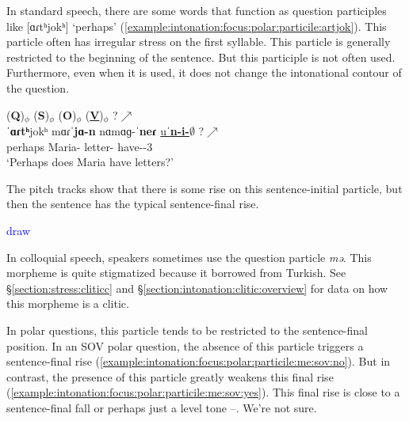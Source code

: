 In standard speech, there are some words that function as question participles like [ɑɾtʰjokʰ] `perhaps' (\ref{example:intonation:focus:polar:particile:artjok}). This particle often has irregular stress on the first syllable. This particle is generally restricted to the beginning of the sentence. But this participle is not often used. Furthermore, even when it is used, it does not change the intonational contour of the question. 

\begin{exe}
	\ex \glll (\textbf{Q})$_\phi$ (\textbf{S})$_\phi$ (\textbf{O})$_\phi$ (\underline{\textbf{V}})$_\phi$  ?$\nearrow$ \\
	ˈ\textbf{ɑɾtʰ}jokʰ mɑɾˈ\textbf{jɑ-n} nɑmɑɡ-ˈ\textbf{neɾ} \underline{uˈ\textbf{n-i-$\emptyset$}} ?$\nearrow$ \\
	perhaps Maria-{} letter-{\pl} have-{\thgloss}-3{\sg} \\
	\trans `Perhaps does Maria have letters?'
	\label{example:intonation:focus:polar:particile:artjok}
	\\ 
\end{exe}


The pitch tracks show that there is some rise on this sentence-initial particle, but then the sentence has the typical sentence-final rise. 

\textcolor{blue}{draw}


In colloquial speech, speakers sometimes use the question particle \textit{mə}. This morpheme is quite stigmatized because it borrowed from Turkish. See \S\ref{section:stress:cliticc} and \S\ref{section:intonation:clitic:overview} for data on how this morpheme  is a clitic. 

In polar questions, this particle tends to be restricted to the sentence-final position. In an SOV polar question, the absence of this particle triggers a sentence-final rise (\ref{example:intonation:focus:polar:particile:me:sov:no}). But in contrast, the presence of this particle greatly weakens this final rise (\ref{example:intonation:focus:polar:particile:me:sov:yes}). This final rise is close to a sentence-final fall or perhaps just a level tone --. We're not sure. 


